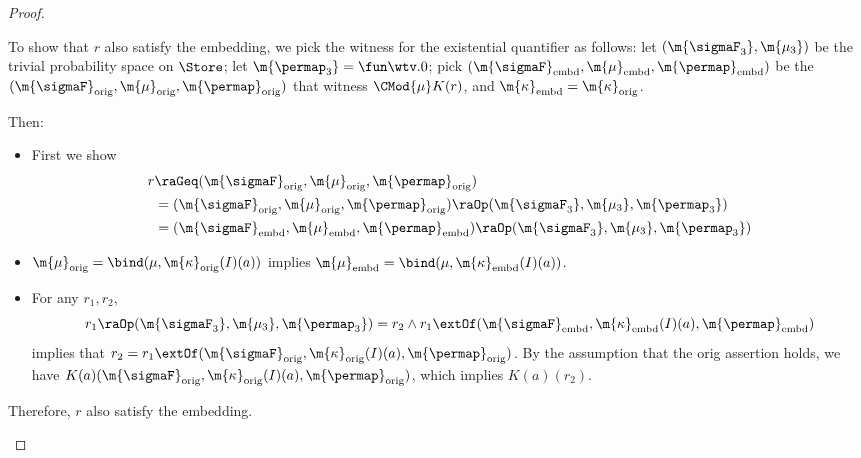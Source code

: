 \documentclass[acmsmall,nonacm,screen,appendix]{acmart}
\begin{document}
\begin{proof}
\begin{itemize}
										To show that $r$ also satisfy the embedding,
										we pick the witness for the existential quantifier as follows:
										let $(\m{\sigmaF_3}, \m{\mu_3})$ be the trivial probability space on
										$\Store$;
										let $\m{\permap_3} = \fun \wtv. 0$;
										pick $(\m{\sigmaF}_{\text{embd}}, \m{\mu}_{\text{embd}}, \m{\permap}_{\text{embd}})$
										be the $(\m{\sigmaF}_{\text{orig}}, \m{\mu}_{\text{orig}}, \m{\permap}_{\text{orig}})$
										that witness $\CMod{\mu} K (r)$,
										and $\m{\kappa}_{\text{embd}} = \m{\kappa}_{\text{orig}}$.

										Then:
										\begin{itemize}
											\item First we show
												\begin{align*}
													r
													&\raGeq
													(\m{\sigmaF}_{\text{orig}}, \m{\mu}_{\text{orig}}, \m{\permap}_{\text{orig}}) \\
													&= (\m{\sigmaF}_{\text{orig}}, \m{\mu}_{\text{orig}}, \m{\permap}_{\text{orig}}) \raOp (\m{\sigmaF_3}, \m{\mu_3}, \m{\permap_3}) \\
													&= (\m{\sigmaF}_{\text{embd}}, \m{\mu}_{\text{embd}}, \m{\permap}_{\text{embd}}) \raOp (\m{\sigmaF_3}, \m{\mu_3}, \m{\permap_3})
												\end{align*}
\item $\m{\mu}_{\text{orig}} = \bind(\mu, \m{\kappa}_{\text{orig}} (I) (a))$ 
											implies $\m{\mu}_{\text{embd}} = \bind(\mu, \m{\kappa}_{\text{embd}} (I) (a))$.
\item For any $r_1, r_2$,
										\[
											r_1 \raOp (\m{\sigmaF_3}, \m{\mu_3}, \m{\permap_3}) = r_2 \land
											r_1 \extOf (\m{\sigmaF}_{\text{embd}}, \m{\kappa}_{\text{embd}} (I)(a), \m{\permap}_{\text{embd}})
										\]
										implies that $r_2 = r_1 \extOf (\m{\sigmaF}_{\text{orig}}, \m{\kappa}_{\text{orig}} (I)(a), \m{\permap}_{\text{orig}})$.
										By the assumption that the orig assertion holds,
										we have $K(a) (\m{\sigmaF}_{\text{orig}}, \m{\kappa}_{\text{orig}} (I)(a), \m{\permap}_{\text{orig}})$,
                which implies $K(a)(r_2)$.
										\end{itemize}

										Therefore, $r$ also satisfy the embedding.\qedhere
								\end{itemize}
									\end{proof}
\end{document}
